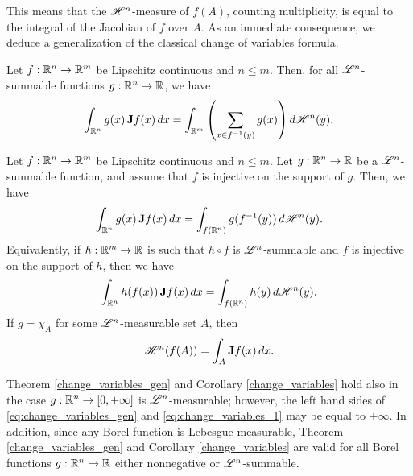This means that the $\mathscr{H}^{n}$-measure of $f(A)$, counting multiplicity, is equal to the integral of the Jacobian of $f$ over $A$. As an immediate consequence, we deduce a generalization of the classical change of variables formula.

\begin{theorem} \label{change_variables_gen}
Let $f : \mathbb{R}^{n} \to \mathbb{R}^{m}$ be Lipschitz continuous and $n \le m$. Then, for all $\mathscr{L}^{n}$-summable functions $g : \mathbb{R}^{n} \to \mathbb{R}$, we have
\begin{equation} \label{eq:change_variables_gen}
\int_{\mathbb{R}^{n}} g(x) \, {\bf J} f(x) \, dx = \int_{\mathbb{R}^{m}} \left (\sum_{x \in f^{-1}(y)} g(x) \right ) d \mathscr{H}^{n}(y).
\end{equation}
\end{theorem}

\begin{corollary} \label{change_variables}
Let $f : \mathbb{R}^{n} \to \mathbb{R}^{m}$ be Lipschitz continuous and $n \le m$. Let $g : \mathbb{R}^{n} \to \mathbb{R}$ be a $\mathscr{L}^{n}$-summable function, and assume that $f$ is injective on the support of $g$. Then, we have
\begin{equation} \label{eq:change_variables_1}
\int_{\mathbb{R}^{n}} g(x) \, {\bf J} f(x) \, dx = \int_{f(\mathbb{R}^{n})} g(f^{-1}(y)) \, d \mathscr{H}^{n}(y).
\end{equation}
Equivalently, if $h : \mathbb{R}^{m} \to \mathbb{R}$ is such that $h \circ f$ is $\mathscr{L}^{n}$-summable and $f$ is injective on the support of $h$, then we have
\begin{equation} \label{eq:change_variables_2}
\int_{\mathbb{R}^{n}} h(f(x)) \, {\bf J} f(x) \, dx = \int_{f(\mathbb{R}^{n})} h(y) \, d \mathscr{H}^{n}(y).
\end{equation}
If $g = \chi_{A}$ for some $\mathscr{L}^{n}$-measurable set $A$, then
\begin{equation} \label{eq:area_formula_inj}
\mathscr{H}^{n}(f(A)) = \int_{A} {\bf J} f(x) \, dx.
\end{equation}
\end{corollary}

\begin{remark} \label{rem:other_good_cases}
Theorem \ref{change_variables_gen} and Corollary \ref{change_variables} hold also in the case $g : \mathbb{R}^{n} \to [0, + \infty]$ is $\mathscr{L}^{n}$-measurable; however, the left hand sides of \eqref{eq:change_variables_gen} and \eqref{eq:change_variables_1} may be equal to $+ \infty$.
In addition, since any Borel function is Lebesgue measurable, Theorem \ref{change_variables_gen} and Corollary \ref{change_variables} are valid for all Borel functions $g : \mathbb{R}^{n} \to \mathbb{R}$ either nonnegative or $\mathscr{L}^{n}$-summable.
\end{remark}

